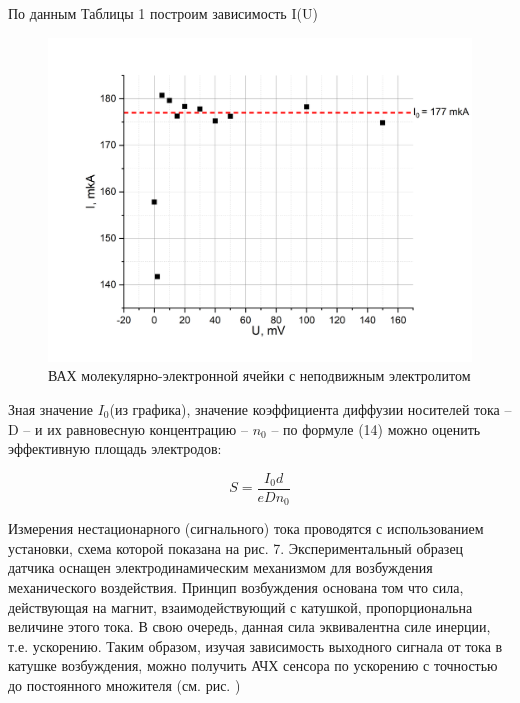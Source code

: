 \documentclass[a4paper,12pt]{article}
\begin{document}
По данным Таблицы 1 построим зависимость I(U)

\begin{figure}[h!]
	\begin{center}
		\includegraphics[scale=0.4]{graph1}
		\caption{ВАХ молекулярно-электронной ячейки с неподвижным электролитом}
	\end{center}
\end{figure}

Зная значение $I_0$(из графика), значение коэффициента диффузии носителей тока -- D -- и их равновесную концентрацию -- $n_0$ -- по формуле (14) можно оценить эффективную площадь электродов:

\[
S = \frac{I_0 d}{e D n_0}
\]

Измерения нестационарного (сигнального) тока проводятся с использованием установки, схема которой показана на рис. 7. Экспериментальный образец датчика оснащен электродинамическим механизмом для возбуждения механического воздействия. Принцип возбуждения основана том что сила, действующая на магнит, взаимодействующий с катушкой, пропорциональна величине этого тока. В свою очередь, данная сила эквивалентна силе инерции, т.е. ускорению. Таким образом, изучая зависимость выходного сигнала от тока в катушке возбуждения, можно получить АЧХ сенсора по ускорению с точностью до постоянного множителя (см. рис. )
\end{document}
